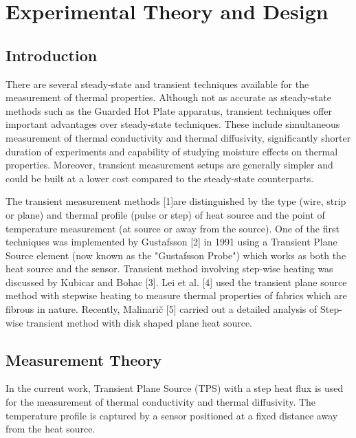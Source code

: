 \documentclass[12pt]{report}
\begin{document}

\chapter*{Experimental Theory and Design}

\section*{Introduction}


There are several steady-state and transient techniques available for the measurement of thermal properties. Although not as accurate as steady-state methods such as the Guarded Hot Plate apparatus, transient techniques offer important advantages over steady-state techniques. These include simultaneous measurement of thermal conductivity and thermal diffusivity, significantly shorter duration of experiments and capability of studying moisture effects on thermal properties.  Moreover, transient measurement setups are generally simpler and could be built at a lower cost compared to the steady-state counterparts.

The transient measurement methods [1]are distinguished by the type (wire, strip or plane) and thermal profile (pulse or step) of heat source and the point of temperature measurement (at source or away from the source). One of the first techniques was implemented by Gustafsson [2] in 1991 using a Transient Plane Source element (now known as the "Gustafsson Probe") which works as both the heat source and the sensor. Transient method involving step-wise heating was discussed by Kubicar and Bohac [3].  Lei et al. [4] used the transient plane source method with stepwise heating to measure thermal properties of fabrics which are fibrous in nature. Recently, Malinarič [5] carried out a detailed analysis of Step-wise transient method with disk shaped plane heat source. 

\section*{Measurement Theory}

In the current work, Transient Plane Source (TPS) with a step heat flux is used for the measurement of thermal conductivity and thermal diffusivity. The temperature profile is captured by a sensor positioned at a fixed distance away from the heat source. 
\end{document}
